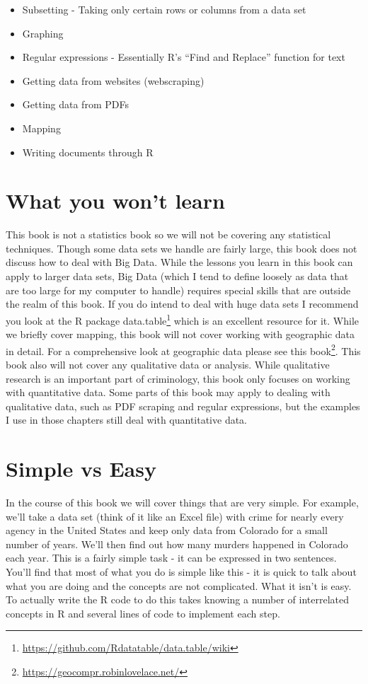 \documentclass[
]{krantz}
\providecommand{\tightlist}{%
  \setlength{\itemsep}{0pt}\setlength{\parskip}{0pt}}
\renewcommand{\href}[2]{#2\footnote{\url{#1}}}
\begin{document}
\begin{itemize}
\tightlist
\item
  Subsetting - Taking only certain rows or columns from a data set
\item
  Graphing
\item
  Regular expressions - Essentially R's ``Find and Replace'' function for text
\item
  Getting data from websites (webscraping)
\item
  Getting data from PDFs
\item
  Mapping
\item
  Writing documents through R
\end{itemize}

\hypertarget{what-you-wont-learn}{%
\section{What you won't learn}\label{what-you-wont-learn}}

This book is not a statistics book so we will not be covering any statistical techniques. Though some data sets we handle are fairly large, this book does not discuss how to deal with Big Data. While the lessons you learn in this book can apply to larger data sets, Big Data (which I tend to define loosely as data that are too large for my computer to handle) requires special skills that are outside the realm of this book. If you do intend to deal with huge data sets I recommend you look at the R package \href{https://github.com/Rdatatable/data.table/wiki}{data.table} which is an excellent resource for it. While we briefly cover mapping, this book will not cover working with geographic data in detail. For a comprehensive look at geographic data please see this \href{https://geocompr.robinlovelace.net/}{book}. This book also will not cover any qualitative data or analysis. While qualitative research is an important part of criminology, this book only focuses on working with quantitative data. Some parts of this book may apply to dealing with qualitative data, such as PDF scraping and regular expressions, but the examples I use in those chapters still deal with quantitative data.

\hypertarget{simple-vs-easy}{%
\section{Simple vs Easy}\label{simple-vs-easy}}

In the course of this book we will cover things that are very simple. For example, we'll take a data set (think of it like an Excel file) with crime for nearly every agency in the United States and keep only data from Colorado for a small number of years. We'll then find out how many murders happened in Colorado each year. This is a fairly simple task - it can be expressed in two sentences. You'll find that most of what you do is simple like this - it is quick to talk about what you are doing and the concepts are not complicated. What it isn't is easy. To actually write the R code to do this takes knowing a number of interrelated concepts in R and several lines of code to implement each step.
\end{document}
